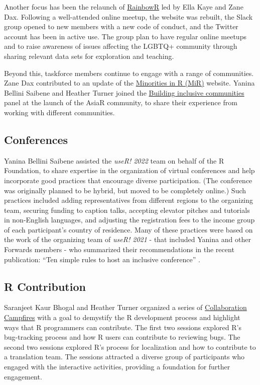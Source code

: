 Another focus has been the relaunch of
\href{https://rainbowr.netlify.app/}{RainbowR} led by Ella Kaye and Zane
Dax. Following a well-attended online meetup, the website was rebuilt,
the Slack group opened to new members with a new code of conduct, and
the Twitter account has been in active use. The group plan to have
regular online meetups and to raise awareness of issues affecting the
LGBTQ+ community through sharing relevant data sets for exploration and
teaching.

Beyond this, taskforce members continue to engage with a range of
communities. Zane Dax contributed to an update of the
\href{https://mircommunity.com/about/}{Minorities in R (MiR)} website.
Yanina Bellini Saibene and Heather Turner joined the
\href{https://github.com/AsiaR-community/2022-inclusive_communities}{Building
inclusive communities} panel at the launch of the AsiaR community, to
share their experience from working with different communities.

\hypertarget{conferences}{%
\subsection{Conferences}\label{conferences}}

Yanina Bellini Saibene assisted the \emph{useR! 2022} team on behalf of
the R Foundation, to share expertise in the organization of virtual
conferences and help incorporate good practices that encourage diverse
participation. (The conference was originally planned to be hybrid, but
moved to be completely online.) Such practices included adding
representatives from different regions to the organizing team, securing
funding to caption talks, accepting elevator pitches and tutorials in
non-English languages, and adjusting the registration fees to the income
group of each participant's country of residence. Many of these
practices were based on the work of the organizing team of \emph{useR!
2021} - that included Yanina and other Forwards members - who summarized
their recommendations in the recent publication: ``Ten simple rules to
host an inclusive conference'' \citep{10sr}.

\hypertarget{r-contribution}{%
\subsection{R Contribution}\label{r-contribution}}

Saranjeet Kaur Bhogal and Heather Turner organized a series of
\href{https://contributor.r-project.org/events/collaboration-campfires}{Collaboration
Campfires} with a goal to demystify the R development process and
highlight ways that R programmers can contribute. The first two sessions
explored R's bug-tracking process and how R users can contribute to
reviewing bugs. The second two sessions explored R's process for
localization and how to contribute to a translation team. The sessions
attracted a diverse group of participants who engaged with the
interactive activities, providing a foundation for further engagement.


